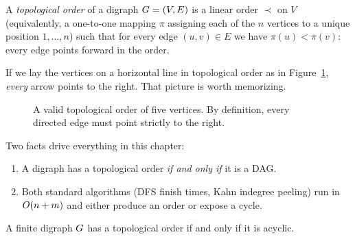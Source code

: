 \begin{definition}\label{ch04:topo-def}
A \emph{topological order} of a digraph $G=(V,E)$ is a linear order $\prec$ on $V$ (equivalently,
a one-to-one mapping $\pi$ assigning each of the $n$ vertices to a unique position $1,\dots,n$) such that for every edge $(u,v)\in E$ we have
$\pi(u)<\pi(v)$: every edge points forward in the order.
\end{definition}

If we lay the vertices on a horizontal line in topological order as in Figure~\ref{fig:ch04-topo-linear}, \emph{every} arrow points to the
right. That picture is worth memorizing.

\begin{figure}[htbp]
\centering
{}
\caption{A valid topological order of five vertices. By definition, every directed edge must point strictly to the right.}
\label{fig:ch04-topo-linear}
\end{figure}

\begin{focusbox}
Two facts drive everything in this chapter:
\begin{enumerate}
\item A digraph has a topological order \emph{if and only if} it is a DAG.
\item Both standard algorithms (DFS finish times, Kahn indegree peeling) run in $O(n+m)$ and
either produce an order or expose a cycle.
\end{enumerate}
\end{focusbox}

\begin{theorem}[Existence]\label{ch04:existence}
A finite digraph $G$ has a topological order if and only if it is acyclic.
\end{theorem}

